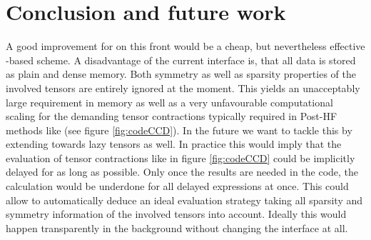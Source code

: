 \chapter{Conclusion and future work}
\label{ch:Conclusion}







A good improvement for \molsturm on this front would be a cheap,
but nevertheless effective \contraction-based \SCF scheme.
%
%
A disadvantage of the current \molsturm interface is,
that all data is stored as plain and dense memory.
Both symmetry as well as sparsity properties of the involved tensors
are entirely ignored at the moment.
This yields an unacceptably large requirement in memory
as well as a very unfavourable computational scaling
for the demanding tensor contractions
typically required in Post-HF methods like \CCD (see figure \ref{fig:codeCCD}).
In the future we want to tackle this by extending
\lazyten towards lazy tensors as well.
In practice this would imply that the evaluation of
tensor contractions like in figure \ref{fig:codeCCD} could be implicitly delayed
for as long as possible.
Only once the results are needed in the code,
the calculation would be underdone
for all delayed expressions at once.
This could allow to automatically deduce an ideal evaluation strategy
taking all sparsity and symmetry information
of the involved tensors into account.
Ideally this would happen transparently in the background
without changing the \python interface at all.

